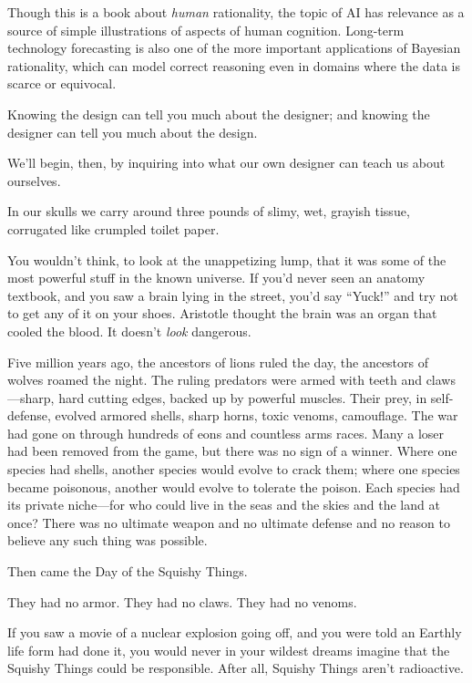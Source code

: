  Though this is a book about \textit{human} rationality, the topic
of AI has relevance as a source of simple illustrations of aspects of
human cognition. Long-term technology forecasting is also one of the
more important applications of Bayesian rationality, which can model
correct reasoning even in domains where the data is scarce or
equivocal.


 Knowing the design can tell you much about the designer; and
knowing the designer can tell you much about the design.


 We'll begin, then, by inquiring into what our own
designer can teach us about ourselves.

\myendsectiontext



 In our skulls we carry around three pounds of slimy, wet, grayish
tissue, corrugated like crumpled toilet paper.


 You wouldn't think, to look at the unappetizing
lump, that it was some of the most powerful stuff in the known
universe. If you'd never seen an anatomy textbook, and
you saw a brain lying in the street, you'd say
``Yuck!'' and try not to get any of
it on your shoes. Aristotle thought the brain was an organ that cooled
the blood. It doesn't \textit{look} dangerous.


 Five million years ago, the ancestors of lions ruled the day, the
ancestors of wolves roamed the night. The ruling predators were armed
with teeth and claws---sharp, hard cutting edges, backed up by powerful
muscles. Their prey, in self-defense, evolved armored shells, sharp
horns, toxic venoms, camouflage. The war had gone on through hundreds
of eons and countless arms races. Many a loser had been removed from
the game, but there was no sign of a winner. Where one species had
shells, another species would evolve to crack them; where one species
became poisonous, another would evolve to tolerate the poison. Each
species had its private niche---for who could live in the seas and the
skies and the land at once? There was no ultimate weapon and no
ultimate defense and no reason to believe any such thing was possible.


 Then came the Day of the Squishy Things.


 They had no armor. They had no claws. They had no venoms.


 If you saw a movie of a nuclear explosion going off, and you were
told an Earthly life form had done it, you would never in your wildest
dreams imagine that the Squishy Things could be responsible. After all,
Squishy Things aren't radioactive.


